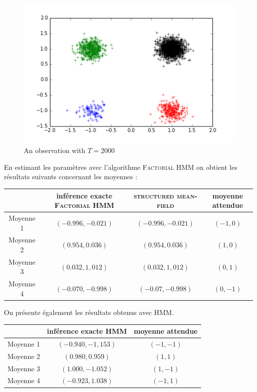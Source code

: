 \documentclass[10pt,a4paper]{article}
\newcommand{\hmm}{\textsc{HMM}}
\newcommand{\fhmm}{\textsc{Factorial HMM}}
\newcommand{\structmeanfield}{\textsc{structured mean-field}}
\begin{document}
 
\begin{figure}[H]
\centering
\includegraphics[scale=0.3]{../resources/pictures/synthetic_data.png}
\caption{An observation with $T= 2000$}
\end{figure} 
 En estimant les paramètres avec l'algorithme \fhmm{} on obtient les résultats suivants concernant les moyennes : 
 \begin{center}
 \begin{tabular}{|c|c|c|c|} 
 \hline
 & inférence exacte \fhmm{} & \structmeanfield{} & moyenne attendue  \\ \hline \hline
 Moyenne 1 & $(-0.996,-0.021)$ & $(-0.996,-0.021)$&$(-1,0)$ \\ \hline
 Moyenne 2 &  $(0.954,0.036)$ &  $(0.954,0.036)$ & $(1,0)$ \\ \hline
 Moyenne 3 & $(0.032,1,012)$ & $(0.032,1,012)$ & $(0,1)$ \\ \hline
 Moyenne 4 & $(-0.070,-0.998)$ & $(-0.07,-0.998)$ &  $(0,-1)$ \\ \hline
 \end{tabular}
\end{center}
On présente également les résultats obtenus avec \hmm{}.
\begin{center}
\begin{tabular}{|c|c|c|}
\hline
& inférence exacte \hmm{} & moyenne attendue \\ \hline \hline
Moyenne 1 & $(-0.940,-1,153)$ & $(-1,-1)$ \\ \hline
Moyenne 2 &$(0.980,0.959)$ & $(1,1)$\\ \hline
Moyenne 3 & $(1.000, -1.052)$ & $(1,-1)$\\ \hline
Moyenne 4 & $(-0.923,1.038)$ & $(-1,1)$\\ \hline
\end{tabular}
\end{center}
\end{document}
